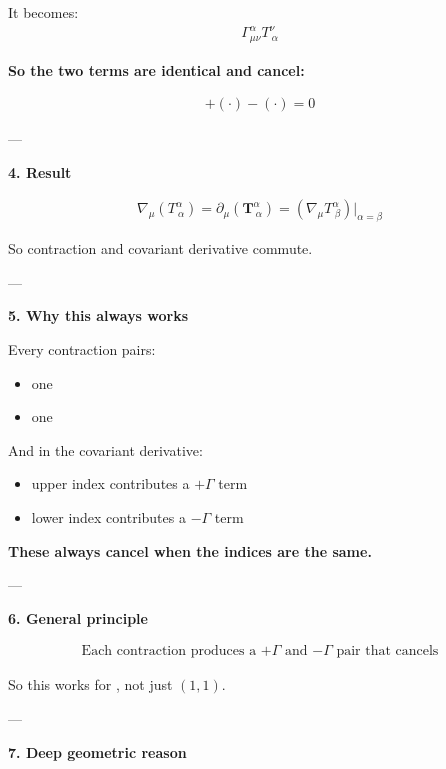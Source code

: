 \documentclass[12pt,a4paper]{report}
\begin{document}
\begin{description}
\begin{description}
It becomes:
\begin{align*}
\Gamma^\alpha_{\mu\nu} T^\nu_{\ \alpha}
\end{align*}

\textbf{ So the two terms are identical and cancel:}

\begin{align*}
+ (\cdot) - (\cdot) = 0
\end{align*}


---

\item \textbf{4. Result}

\begin{align*}
\boxed{
\nabla_\mu (T^\alpha_{\ \alpha}) = \partial_\mu (\textbf{T}^\alpha_{\ \alpha}) = (\nabla_\mu T^\alpha_{\ \beta})\big|_{\alpha=\beta} 
}
\end{align*}

So contraction and covariant derivative commute.

---

\item \textbf{5. Why this always works}

Every contraction pairs:

\begin{itemize}
\item one 
\item one 
\end{itemize}

And in the covariant derivative:

\begin{itemize}
\item upper index contributes a $+\Gamma$ term
\item lower index contributes a $-\Gamma$ term
\end{itemize}

\textbf{ These always cancel when the indices are the same.}

---

\item \textbf{6. General principle}

\begin{align*}
\boxed{
\text{Each contraction produces a $+\Gamma$ and $-\Gamma$ pair that cancels}
}
\end{align*}

So this works for , not just $(1,1)$.

---

\item \textbf{7. Deep geometric reason}


\end{description}
\end{description}
\end{document}
